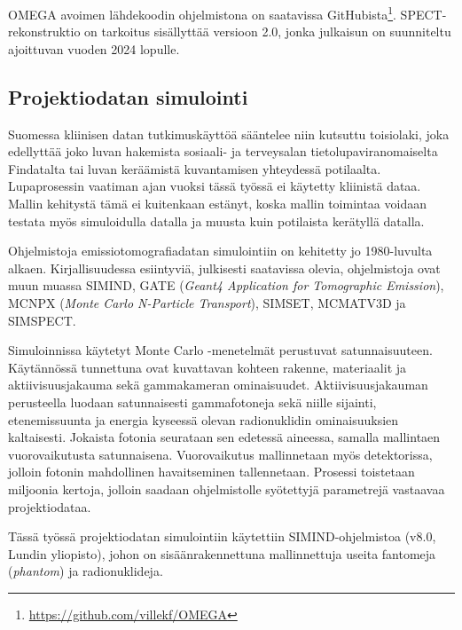 OMEGA avoimen lähdekoodin ohjelmistona on saatavissa GitHubista\footnote{\url{https://github.com/villekf/OMEGA}}. SPECT-rekonstruktio on tarkoitus sisällyttää versioon 2.0, jonka julkaisun on suunniteltu ajoittuvan vuoden 2024 lopulle.

\subsection{Projektiodatan simulointi}
Suomessa kliinisen datan tutkimuskäyttöä sääntelee niin kutsuttu toisiolaki, joka edellyttää joko luvan hakemista sosiaali- ja terveysalan tietolupaviranomaiselta Findatalta tai luvan keräämistä kuvantamisen yhteydessä potilaalta. Lupaprosessin vaatiman ajan vuoksi tässä työssä ei käytetty kliinistä dataa. Mallin kehitystä tämä ei kuitenkaan estänyt, koska mallin toimintaa voidaan testata myös simuloidulla datalla ja muusta kuin potilaista kerätyllä datalla.

Ohjelmistoja emissiotomografiadatan simulointiin on kehitetty jo 1980-luvulta alkaen\cite{ljungberg_monte_1989}. Kirjallisuudessa esiintyviä, julkisesti saatavissa olevia, ohjelmistoja ovat muun muassa SIMIND\cite{ljungberg_monte_1989, taheri_monte_2017, giannone_monte_1999}, GATE (\textit{Geant4 Application for Tomographic Emission})\cite{jan_gate_2004, taheri_monte_2017}, MCNPX (\textit{Monte Carlo N-Particle Transport})\cite{taheri_monte_2017}, SIMSET\cite{giannone_monte_1999}, MCMATV3D\cite{giannone_monte_1999} ja SIMSPECT\cite{giannone_monte_1999}.

Simuloinnissa käytetyt Monte Carlo -menetelmät perustuvat satunnaisuuteen. Käytännössä tunnettuna ovat kuvattavan kohteen rakenne, materiaalit ja aktiivisuusjakauma sekä gammakameran ominaisuudet. Aktiivisuusjakauman perusteella luodaan satunnaisesti gammafotoneja sekä niille sijainti, etenemissuunta ja energia kyseessä olevan radionuklidin ominaisuuksien kaltaisesti. Jokaista fotonia seurataan sen edetessä aineessa, samalla mallintaen vuorovaikutusta satunnaisena. Vuorovaikutus mallinnetaan myös detektorissa, jolloin fotonin mahdollinen havaitseminen tallennetaan. Prosessi toistetaan miljoonia kertoja, jolloin saadaan ohjelmistolle syötettyjä parametrejä vastaavaa projektiodataa.\cite{ljungberg_monte_1989}

Tässä työssä projektiodatan simulointiin käytettiin SIMIND-ohjelmistoa (v8.0, Lundin yliopisto)\cite{ljungberg_monte_1989}, johon on sisäänrakennettuna mallinnettuja useita fantomeja (\textit{phantom}) ja radionuklideja.

